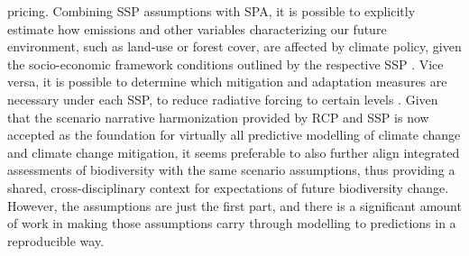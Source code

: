 pricing. Combining SSP assumptions with SPA, it is possible to explicitly estimate how emissions and other variables characterizing our future environment, such as land-use or forest cover, are affected by climate policy, given the socio-economic framework conditions outlined by the respective SSP \citep{kriegler_new_2014, riahi_shared_2017}. Vice versa, it is possible to determine which mitigation and adaptation measures are necessary under each SSP, to reduce radiative forcing to certain levels \citep[for example in order to achieve the Paris warming target,][]{wigley_paris_2018}. Given that the scenario narrative harmonization provided by RCP and SSP is now accepted as the foundation for virtually all predictive modelling of climate change and climate change mitigation, it seems preferable to also further align integrated assessments of biodiversity with the same scenario assumptions, thus providing a shared, cross-disciplinary context for expectations of future biodiversity change. However, the assumptions are just the first part, and there is a significant amount of work in making those assumptions carry through modelling to predictions in a reproducible way. 

